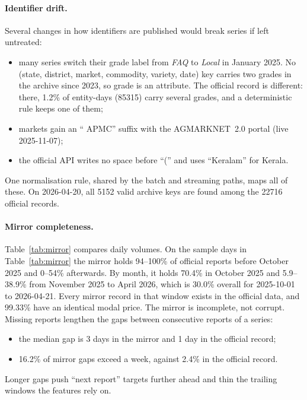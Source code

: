 \paragraph{Identifier drift.}
Several changes in how identifiers are published would break series if left untreated:
\begin{itemize}
  \item many series switch their grade label from \emph{FAQ} to \emph{Local} in January 2025. No (state, district, market, commodity, variety, date) key carries two grades in the archive since 2023, so grade is an attribute. The official record is different: there, 1.2\% of entity-days (\num{85315}) carry several grades, and a deterministic rule keeps one of them;
  \item markets gain an `` APMC'' suffix with the AGMARKNET~2.0 portal (live 2025-11-07);
  \item the official API writes no space before ``('' and uses ``Keralam'' for Kerala.
\end{itemize}
One normalisation rule, shared by the batch and streaming paths, maps all of these. On 2026-04-20, all \num{5152} valid archive keys are found among the \num{22716} official records.

\paragraph{Mirror completeness.}
Table~\ref{tab:mirror} compares daily volumes.
On the sample days in Table~\ref{tab:mirror} the mirror holds 94--100\% of official reports before October 2025 and 0--54\% afterwards. By month, it holds 70.4\% in October 2025 and 5.9--38.9\% from November 2025 to April 2026, which is 30.0\% overall for 2025-10-01 to 2026-04-21.
Every mirror record in that window exists in the official data, and 99.33\% have an identical modal price. The mirror is incomplete, not corrupt.
Missing reports lengthen the gaps between consecutive reports of a series:
\begin{itemize}
  \item the median gap is 3 days in the mirror and 1 day in the official record;
  \item 16.2\% of mirror gaps exceed a week, against 2.4\% in the official record.
\end{itemize}
Longer gaps push ``next report'' targets further ahead and thin the trailing windows the features rely on.

